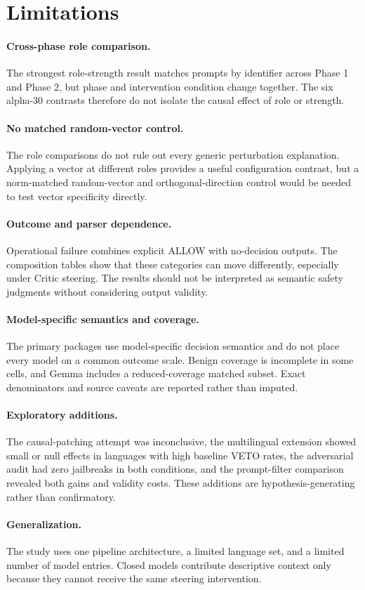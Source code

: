 \section{Limitations}
\paragraph{Cross-phase role comparison.} The strongest role-strength result matches prompts by identifier across Phase 1 and Phase 2, but phase and intervention condition change together. The six alpha-30 contrasts therefore do not isolate the causal effect of role or strength.

\paragraph{No matched random-vector control.} The role comparisons do not rule out every generic perturbation explanation. Applying a vector at different roles provides a useful configuration contrast, but a norm-matched random-vector and orthogonal-direction control would be needed to test vector specificity directly.

\paragraph{Outcome and parser dependence.} Operational failure combines explicit ALLOW with no-decision outputs. The composition tables show that these categories can move differently, especially under Critic steering. The results should not be interpreted as semantic safety judgments without considering output validity.

\paragraph{Model-specific semantics and coverage.} The primary packages use model-specific decision semantics and do not place every model on a common outcome scale. Benign coverage is incomplete in some cells, and Gemma includes a reduced-coverage matched subset. Exact denominators and source caveats are reported rather than imputed.

\paragraph{Exploratory additions.} The causal-patching attempt was inconclusive, the multilingual extension showed small or null effects in languages with high baseline VETO rates, the adversarial audit had zero jailbreaks in both conditions, and the prompt-filter comparison revealed both gains and validity costs. These additions are hypothesis-generating rather than confirmatory.

\paragraph{Generalization.} The study uses one pipeline architecture, a limited language set, and a limited number of model entries. Closed models contribute descriptive context only because they cannot receive the same steering intervention.